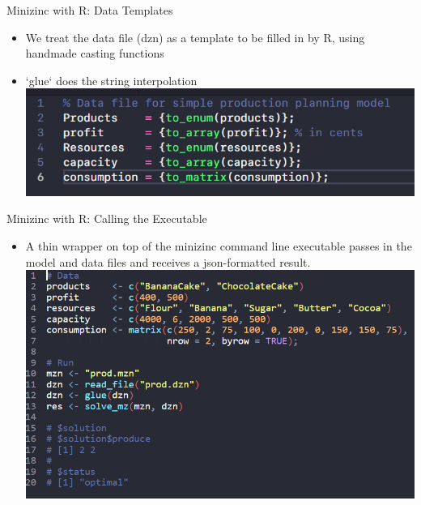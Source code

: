 \documentclass[xcolor=dvipsnames,aspectratio=169]{beamer}
\begin{document}
\begin{frame}{Minizinc with R: Data Templates}
   \begin{itemize}
    \item We treat the data file (dzn) as a template to be filled in by R, using handmade casting functions
    \item `glue` does the string interpolation
    \includegraphics[scale = 0.65]{mz_production_data_2.png} 
   \end{itemize}
    
\end{frame}

\begin{frame}{Minizinc with R: Calling the Executable}
   \begin{itemize}
    \item A thin wrapper on top of the minizinc command line executable passes in the model and data files and receives a json-formatted result. 
    \includegraphics[scale = 0.60]{mz_production_result.png} 
   \end{itemize}
    
\end{frame}
\end{document}

